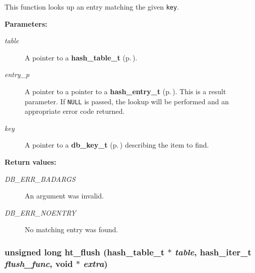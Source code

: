  This function looks up an entry matching the given {\tt key}.\begin{Desc}
\item[{\bf Parameters: }]\par
\begin{description}
\item[
{\em table}]A pointer to a {\bf hash\_\-table\_\-t} {\rm (p.\,\pageref{group__dbprim__hash_a0})}. \item[
{\em entry\_\-p}]A pointer to a pointer to a {\bf hash\_\-entry\_\-t} {\rm (p.\,\pageref{group__dbprim__hash_a1})}. This is a result parameter. If {\tt NULL} is passed, the lookup will be performed and an appropriate error code returned.  \item[
{\em key}]A pointer to a {\bf db\_\-key\_\-t} {\rm (p.\,\pageref{group__dbprim__key_a0})} describing the item to find.\end{description}
\end{Desc}
\begin{Desc}
\item[{\bf Return values: }]\par
\begin{description}
\item[
{\em DB\_\-ERR\_\-BADARGS}]An argument was invalid. \item[
{\em DB\_\-ERR\_\-NOENTRY}]No matching entry was found. \end{description}
\end{Desc}
\subsubsection{\setlength{\rightskip}{0pt plus 5cm}unsigned long ht\_\-flush ({\bf hash\_\-table\_\-t} $\ast$ {\em table}, {\bf hash\_\-iter\_\-t} {\em flush\_\-func}, void $\ast$ {\em extra})}\label{group__dbprim__hash_a12}




